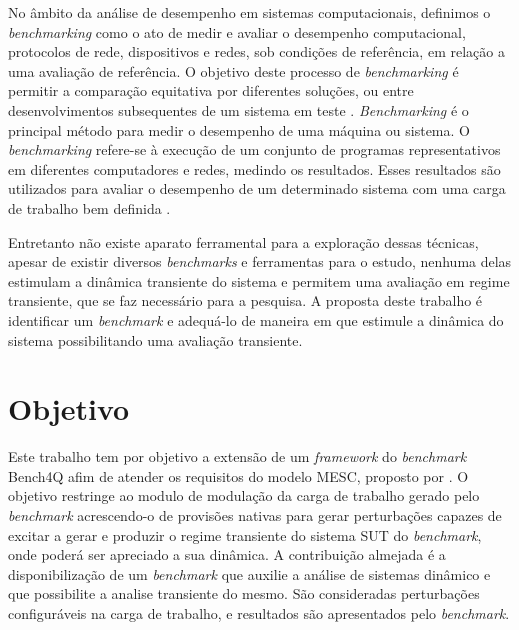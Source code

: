No âmbito da análise de desempenho em sistemas computacionais, definimos o \textit{benchmarking} como o ato de medir e avaliar o desempenho computacional, protocolos de rede, dispositivos e redes, sob condições de referência, em relação a uma avaliação de referência. O objetivo deste processo de \textit{benchmarking} é permitir a comparação equitativa por diferentes soluções, ou entre desenvolvimentos subsequentes de um sistema em teste \textit{}. \textit{Benchmarking} é o principal método para medir o desempenho de uma máquina ou sistema. O \textit{benchmarking} refere-se à execução de um conjunto de programas representativos em diferentes computadores e redes, medindo os resultados. Esses resultados são utilizados para avaliar o desempenho de um determinado sistema com uma carga de trabalho bem definida \cite{Menasce2001}.

Entretanto não existe aparato ferramental para a exploração dessas técnicas, apesar de existir diversos \textit{benchmarks} e ferramentas para o estudo, nenhuma delas estimulam a dinâmica transiente do sistema e permitem uma avaliação em regime transiente, que se faz necessário para a pesquisa. A proposta deste trabalho é identificar um \textit{benchmark} e adequá-lo de maneira em que estimule a dinâmica do sistema possibilitando uma avaliação transiente.


\section{Objetivo}
Este trabalho tem por objetivo a extensão de um \textit{framework} do \textit{benchmark} Bench4Q afim de atender os requisitos do modelo MESC, proposto por . O objetivo restringe ao modulo de modulação da carga de trabalho gerado pelo \textit{benchmark} acrescendo-o de provisões nativas para gerar perturbações capazes de excitar a gerar e produzir o regime transiente do sistema SUT do \textit{benchmark}, onde poderá ser apreciado a sua dinâmica.  A contribuição almejada é a disponibilização de um \textit{benchmark} que auxilie a análise de sistemas dinâmico e que possibilite a analise transiente do mesmo. São consideradas perturbações configuráveis na carga de trabalho, e resultados são apresentados pelo \textit{benchmark}.


